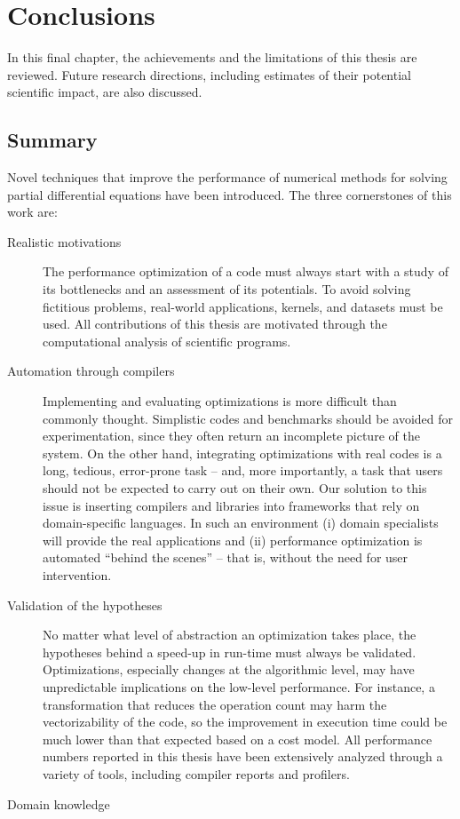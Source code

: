 \chapter{Conclusions}
In this final chapter, the achievements and the limitations of this thesis are reviewed. Future research directions, including estimates of their potential scientific impact, are also discussed. 

\section{Summary}
Novel techniques that improve the performance of numerical methods for solving partial differential equations have been introduced. The three cornerstones of this work are:

\begin{description} 
\item[Realistic motivations] The performance optimization of a code must always start with a study of its bottlenecks and an assessment of its potentials. To avoid solving fictitious problems, real-world applications, kernels, and datasets must be used. All contributions of this thesis are motivated through the computational analysis of scientific programs.
\item[Automation through compilers] Implementing and evaluating optimizations is more difficult than commonly thought. Simplistic codes and benchmarks should be avoided for experimentation, since they often return an incomplete picture of the system. On the other hand, integrating optimizations with real codes is a long, tedious, error-prone task -- and, more importantly, a task that users should not be expected to carry out on their own. Our solution to this issue is inserting compilers and libraries into frameworks that rely on domain-specific languages. In such an environment (i) domain specialists will provide the real applications and (ii) performance optimization is automated ``behind the scenes'' -- that is, without the need for user intervention.
\item[Validation of the hypotheses] No matter what level of abstraction an optimization takes place, the hypotheses behind a speed-up in run-time must always be validated. Optimizations, especially changes at the algorithmic level, may have unpredictable implications on the low-level performance. For instance, a transformation that reduces the operation count may harm the vectorizability of the code, so the improvement in execution time could be much lower than that expected based on a cost model. All performance numbers reported in this thesis have been extensively analyzed through a variety of tools, including compiler reports and profilers. 
\item[Domain knowledge]
\end{description}


